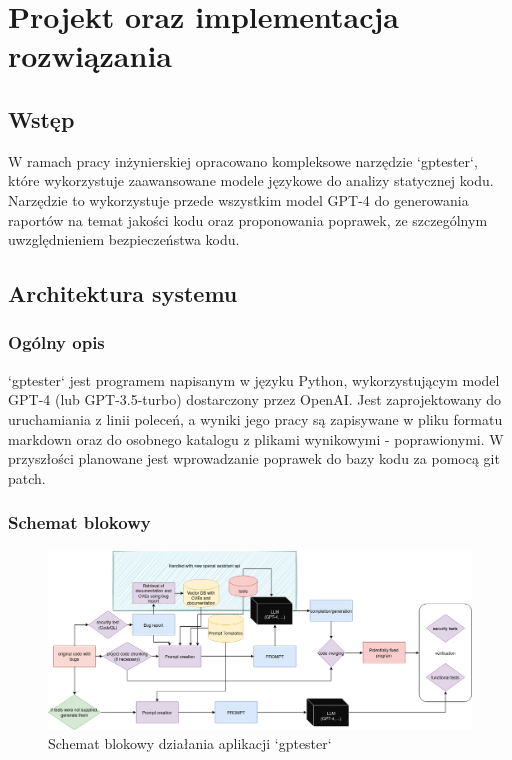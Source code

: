 
\chapter{Projekt oraz implementacja rozwiązania}

\section{Wstęp}
W ramach pracy inżynierskiej opracowano kompleksowe narzędzie `gptester`, które wykorzystuje zaawansowane modele językowe do analizy statycznej kodu.
Narzędzie to wykorzystuje przede wszystkim model GPT-4 do generowania raportów na temat jakości kodu oraz proponowania poprawek, ze szczególnym uwzględnieniem bezpieczeństwa kodu.

\section{Architektura systemu}
\subsection{Ogólny opis}
`gptester` jest programem napisanym w języku Python, wykorzystującym model GPT-4 (lub GPT-3.5-turbo) dostarczony przez OpenAI. 
Jest zaprojektowany do uruchamiania z linii poleceń, a wyniki jego pracy są zapisywane w pliku formatu markdown oraz do osobnego katalogu z plikami wynikowymi - poprawionymi. 
W przyszłości planowane jest wprowadzanie poprawek do bazy kodu za pomocą git patch.

\subsection{Schemat blokowy}
\label{subsec:schemat_blokowy}

\begin{landscape}
\begin{figure}[p]
    \centering
    \includegraphics[width=\linewidth]{img/gptester.drawio.png}
    \caption{Schemat blokowy działania aplikacji `gptester`}
    \label{fig:schemat_blokowy}
\end{figure}
\end{landscape}

